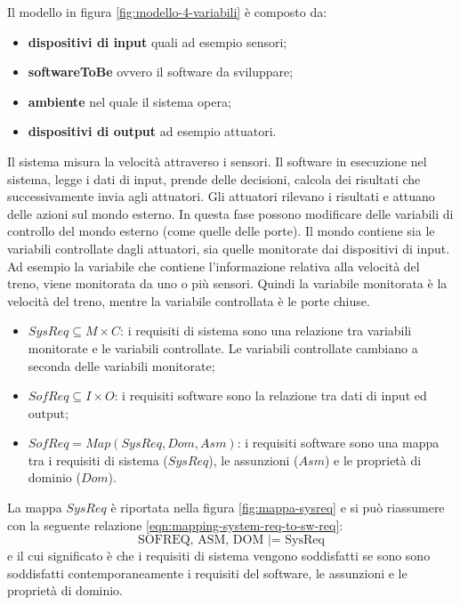 \documentclass[italian]{article}
\begin{document}
	Il modello in figura \ref{fig:modello-4-variabili} è composto da:
	\begin{itemize}
		\item \textbf{dispositivi di input} quali ad esempio sensori;
		\item \textbf{softwareToBe} ovvero il software da sviluppare;
		\item \textbf{ambiente} nel quale il sistema opera;
		\item \textbf{dispositivi di output} ad esempio attuatori.
	\end{itemize}
	Il sistema misura la velocità attraverso i sensori. Il software in esecuzione nel sistema, legge i dati di input, prende delle decisioni, calcola dei risultati che successivamente invia agli attuatori. Gli attuatori rilevano i risultati e attuano delle azioni sul mondo esterno. In questa fase possono modificare delle variabili di controllo del mondo esterno (come quelle delle porte). Il mondo contiene sia le variabili controllate dagli attuatori, sia quelle monitorate dai dispositivi di input. Ad esempio la variabile che contiene l'informazione relativa alla velocità del treno, viene monitorata da uno o più sensori. Quindi la variabile monitorata è la velocità del treno, mentre la variabile controllata è le porte chiuse.
	\begin{itemize}
		\item 	$SysReq \subseteq M \times C$: i requisiti di sistema sono una relazione tra variabili monitorate e le variabili controllate. Le variabili controllate cambiano a seconda delle variabili monitorate;
		\item $SofReq \subseteq I \times O$: i requisiti software sono la relazione tra dati di input ed output;
		\item $SofReq = Map(SysReq, Dom, Asm)$: i requisiti software sono una mappa tra i requisiti di sistema ($SysReq$), le assunzioni ($Asm$) e le proprietà di dominio ($Dom$).
	\end{itemize}
	La mappa $SysReq$ è riportata nella figura \ref{fig:mappa-sysreq} e si può riassumere con la seguente relazione \ref{eqn:mapping-system-req-to-sw-req}:
	\begin{equation}
		\text{SOFREQ, ASM, DOM |= SysReq}
		\label{eqn:mapping-system-req-to-sw-req}
	\end{equation}
	e il cui significato è che i requisiti di sistema vengono soddisfatti se sono sono soddisfatti contemporaneamente i requisiti del software, le assunzioni e le proprietà di dominio.
\end{document}
